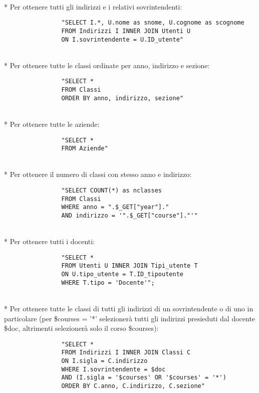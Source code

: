 \documentclass[12pt]{article}
\begin{document}
\\*
\noindent
Per ottenere tutti gli indirizzi e i relativi sovrintendenti:
\begin{verbatim}
                "SELECT I.*, U.nome as snome, U.cognome as scognome
                FROM Indirizzi I INNER JOIN Utenti U
                ON I.sovrintendente = U.ID_utente"
\end{verbatim}

\\*
\noindent
Per ottenere tutte le classi ordinate per anno, indirizzo e sezione:
\begin{verbatim}
                "SELECT *
                FROM Classi
                ORDER BY anno, indirizzo, sezione"
\end{verbatim}

\\*
\noindent
Per ottenere tutte le aziende:
\begin{verbatim}
                "SELECT *
                FROM Aziende"
\end{verbatim}

\\*
\noindent
Per ottenere il numero di classi con stesso anno e indirizzo:
\begin{verbatim}
                "SELECT COUNT(*) as nclasses
                FROM Classi
                WHERE anno = ".$_GET["year"]."
                AND indirizzo = '".$_GET["course"]."'"
\end{verbatim}

\\*
\noindent
Per ottenere tutti i docenti:
\begin{verbatim}
                "SELECT *
                FROM Utenti U INNER JOIN Tipi_utente T
                ON U.tipo_utente = T.ID_tipoutente
                WHERE T.tipo = 'Docente'";
\end{verbatim}

\\*
\newpage
\noindent
Per ottenere tutte le classi di tutti gli indirizzi di un sovrintendente o di uno in particolare (per \$courses = '*' selezionerà tutti gli indirizzi presieduti dal docente \$doc, altrimenti selezionerà solo il corso \$courses):
\begin{verbatim}
                "SELECT *
                FROM Indirizzi I INNER JOIN Classi C
                ON I.sigla = C.indirizzo
                WHERE I.sovrintendente = $doc
                AND (I.sigla = '$courses' OR '$courses' = '*')
                ORDER BY C.anno, C.indirizzo, C.sezione"
\end{verbatim}
\end{document}
